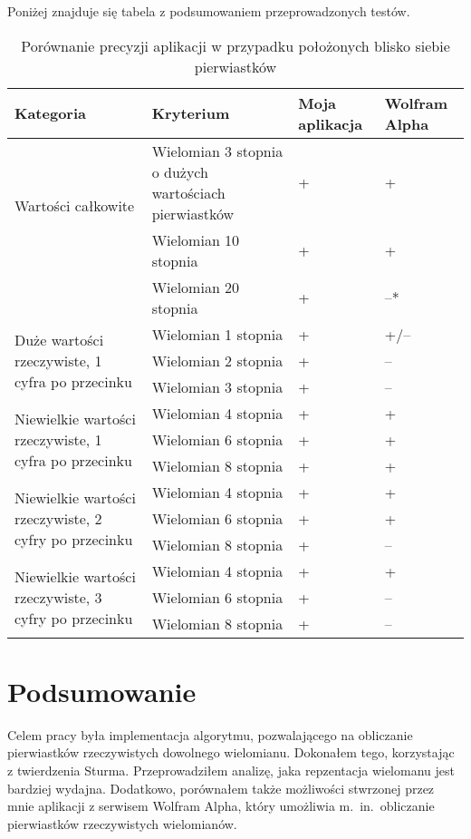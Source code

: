 \documentclass[oneside,a4paper]{book}
\begin{document}
	Poniżej znajduje się tabela z podsumowaniem przeprowadzonych testów.
	
	\begin{table}
		\caption{Porównanie precyzji aplikacji w przypadku położonych blisko siebie pierwiastków}
		\begin{tabular}{ |p{5cm}|p{5cm}|p{1.5cm}|p{1.5cm}| } 
			\hline
			Kategoria & Kryterium & Moja aplikacja & Wolfram Alpha \\
			\hline
			\multirow{2}{*}{Wartości całkowite}
			& Wielomian 3 stopnia o dużych wartościach pierwiastków & + & + \\
			& Wielomian 10 stopnia & + & + \\
			& Wielomian 20 stopnia & + & --* \\
			\hline
			\multirow{3}{12em}{Duże wartości rzeczywiste, 1 cyfra po przecinku}
			& Wielomian 1 stopnia & + & +/-- \\
			& Wielomian 2 stopnia & + & -- \\
			& Wielomian 3 stopnia & + & -- \\
			\hline
			\multirow{3}{14em}{Niewielkie wartości rzeczywiste, 1 cyfra po przecinku}
			& Wielomian 4 stopnia & + & + \\
			& Wielomian 6 stopnia & + & + \\
			& Wielomian 8 stopnia & + & + \\
			\hline
			\multirow{3}{14em}{Niewielkie wartości rzeczywiste, 2 cyfry po przecinku}
			& Wielomian 4 stopnia & + & + \\
			& Wielomian 6 stopnia & + & + \\
			& Wielomian 8 stopnia & + & -- \\
			\hline
			\multirow{3}{14em}{Niewielkie wartości rzeczywiste, 3 cyfry po przecinku}
			& Wielomian 4 stopnia & + & + \\
			& Wielomian 6 stopnia & + & -- \\
			& Wielomian 8 stopnia & + & -- \\
			\hline
		\end{tabular}
	\end{table}

	\chapter{Podsumowanie}
	
	Celem pracy była implementacja algorytmu, pozwalającego na obliczanie pierwiastków rzeczywistych dowolnego wielomianu. Dokonałem tego, korzystając z twierdzenia Sturma. Przeprowadziłem analizę, jaka repzentacja wielomanu jest bardziej wydajna. Dodatkowo, porównałem także możliwości stwrzonej przez mnie aplikacji z serwisem Wolfram Alpha, który umożliwia m.\ in.\ obliczanie pierwiastków rzeczywistych wielomianów.
	
\end{document}
